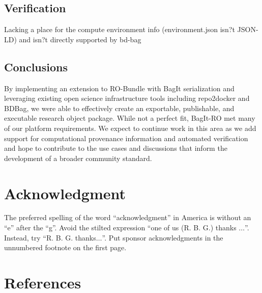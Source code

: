 \documentclass[conference]{IEEEtran}
\begin{document}
\subsection{Verification}
Lacking a place for the compute environment info (environment.json isn?t JSON-LD) and isn?t directly supported by bd-bag


\subsection{Conclusions}
By implementing an extension to RO-Bundle with BagIt serialization and leveraging existing open science infrastructure tools including repo2docker and BDBag, we were able to effectively create an exportable, publishable, and executable research object package.  While not a perfect fit, BagIt-RO met many of our platform requirements. We expect to continue work in this area as we add support for computational provenance information and automated verification and hope to contribute to the use cases and discussions that inform the development of a broader community standard.

\section*{Acknowledgment}

The preferred spelling of the word ``acknowledgment'' in America is without 
an ``e'' after the ``g''. Avoid the stilted expression ``one of us (R. B. 
G.) thanks $\ldots$''. Instead, try ``R. B. G. thanks$\ldots$''. Put sponsor 
acknowledgments in the unnumbered footnote on the first page.

\section*{References}



\end{document}
